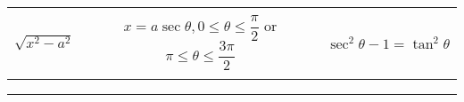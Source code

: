 \documentclass[
  landscape,  
  10pt,
]{article}
\begin{document}
\begin{longtable}[]{@{}ccc@{}}
\begin{minipage}[t]{0.30\columnwidth}
\strut
\end{minipage}\tabularnewline
\begin{minipage}[t]{0.30\columnwidth}\centering
\(\sqrt{x^2-a^2}\)\strut
\end{minipage} & \begin{minipage}[t]{0.30\columnwidth}\centering
\(x = a \sec \theta, 0 \leq \theta \leq \dfrac{\pi}{2}\) or
\(\pi \leq \theta \leq \dfrac{3\pi}{2}\)\strut
\end{minipage} & \begin{minipage}[t]{0.30\columnwidth}\centering
\(\sec^2 \theta - 1 = \tan^2 \theta\)\strut
\end{minipage}\tabularnewline
\begin{minipage}[t]{0.30\columnwidth}\centering
\strut
\end{minipage} & \begin{minipage}[t]{0.30\columnwidth}\centering
\strut
\end{minipage} & \begin{minipage}[t]{0.30\columnwidth}\centering
\strut
\end{minipage}\tabularnewline
\bottomrule
\end{longtable}

\begin{center}\rule{0.5\linewidth}{0.5pt}\end{center}
\end{document}
